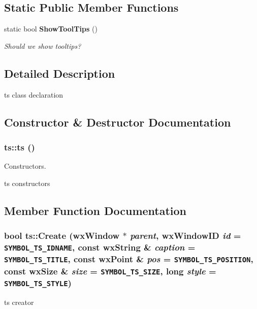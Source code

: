 \subsection*{Static Public Member Functions}
\begin{CompactItemize}
\item 
static bool {\bf Show\-Tool\-Tips} ()
\begin{CompactList}\small\item\em Should we show tooltips? \item\end{CompactList}\end{CompactItemize}


\subsection{Detailed Description}
ts class declaration 



\subsection{Constructor \& Destructor Documentation}
\subsubsection{\setlength{\rightskip}{0pt plus 5cm}ts::ts ()}\label{classts_73ce457a1c8db5eb483e19ca64e250f7}


Constructors. 

ts constructors 

\subsection{Member Function Documentation}
\subsubsection{\setlength{\rightskip}{0pt plus 5cm}bool ts::Create (wx\-Window $\ast$ {\em parent}, wx\-Window\-ID {\em id} = {\tt SYMBOL\_\-TS\_\-IDNAME}, const wx\-String \& {\em caption} = {\tt SYMBOL\_\-TS\_\-TITLE}, const wx\-Point \& {\em pos} = {\tt SYMBOL\_\-TS\_\-POSITION}, const wx\-Size \& {\em size} = {\tt SYMBOL\_\-TS\_\-SIZE}, long {\em style} = {\tt SYMBOL\_\-TS\_\-STYLE})}\label{classts_42533451b54a43171ab0c8fb582a1b45}


ts creator 
